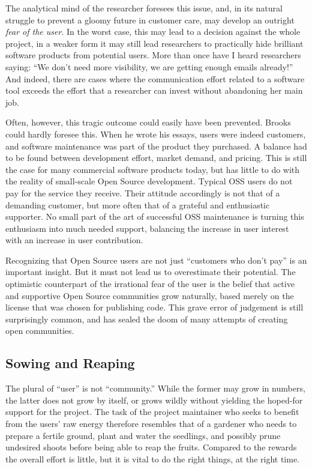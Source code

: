The analytical mind of the researcher foresees this issue, and, in its natural struggle to prevent a gloomy future in customer care, may develop an outright \emph{fear of the user}. In the worst case, this may lead to a decision against the whole project, in a weaker form it may still lead researchers to practically hide brilliant software products from potential users. More than once have I heard researchers saying: ``We don't need more visibility, we are getting enough emails already!''  And indeed, there are cases where the communication effort related to a software tool exceeds the effort that a researcher can invest without abandoning her main job.

Often, however, this tragic outcome could easily have been prevented. Brooks could hardly foresee this. When he wrote his essays, users were indeed customers, and software maintenance was part of the product they purchased. A balance had to be found between development effort, market demand, and pricing. This is still the case for many commercial software products today, but has little to do with the reality of small-scale Open Source development. Typical OSS users do not pay for the service they receive. Their attitude accordingly is not that of a demanding customer, but more often that of a grateful and enthusiastic supporter. No small part of the art of successful OSS maintenance is turning this enthusiasm into much needed support, balancing the increase in user interest with an increase in user contribution.

Recognizing that Open Source users are not just ``customers who don't pay'' is an important insight. But it must not lead us to overestimate their potential. The optimistic counterpart of the irrational fear of the user is the belief that active and supportive Open Source communities grow naturally, based merely on the license that was chosen for publishing code. This grave error of judgement is still surprisingly common, and has sealed the doom of many attempts of creating open communities.

\subsection*{Sowing and Reaping}

The plural of ``user'' is not ``community.'' While the former may grow in numbers, the latter does not grow by itself, or grows wildly without yielding the hoped-for support for the project. The task of the project maintainer who seeks to benefit from the users' raw energy therefore resembles that of a gardener who needs to prepare a fertile ground, plant and water the seedlings, and possibly prune undesired shoots before being able to reap the fruits. Compared to the rewards the overall effort is little, but it is vital to do the right things, at the right time.

